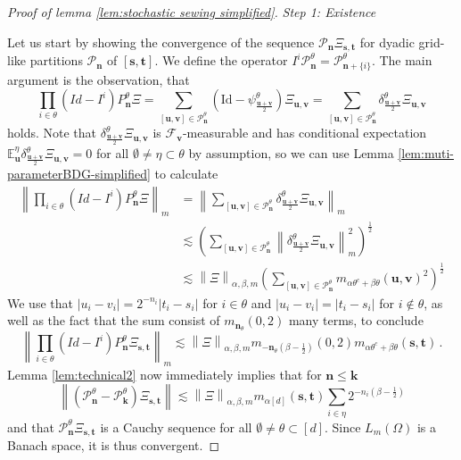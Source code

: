 \documentclass[11pt,oneside,english,reqno]{amsart}
\numberwithin{equation}{section}
\numberwithin{figure}{section}
\theoremstyle{plain}
\theoremstyle{definition}
\theoremstyle{remark}
\theoremstyle{plain}
\theoremstyle{plain}
\theoremstyle{plain}
\theoremstyle{plain}
\theoremstyle{plain}
\newcommand{\cF}{\mathcal{F}}
\newcommand{\cP}{\mathcal{P}}
\newcommand{\EE}{\mathbb{E}}
\newcommand{\bk}{\mathbf{k}}
\newcommand{\bn}{\mathbf{n}}
\newcommand{\bu}{\mathbf{u}}
\newcommand{\bv}{\mathbf{v}}
\newcommand{\bs}{\mathbf{s}}
\newcommand{\bt}{\mathbf{t}}
\newcommand{\Id}{\mathrm{Id}}
\newcommand{\norm}[1]{\left\lVert #1\right\rVert}
\newcommand{\abs}[1]{\left\lvert #1\right\rvert}
\begin{document}
\begin{proof}[Proof of lemma \ref{lem:stochastic sewing simplified}]

    \textit{Step 1: Existence}

    \noindent
    Let us start by showing the convergence of the sequence $\cP_\bn\Xi_{\bs,\bt}$ for dyadic grid-like partitions $\cP_\bn$ of $[\bs,\bt]$. We define the operator $I^i \cP^\theta_\bn = \cP^\theta_{\bn+\{i\}}$. The main argument is the observation, that
%
    \begin{equation}\label{eq:deltas}
        \prod_{i\in\theta}(Id-I^i)P^\theta_{\bn}\Xi = \sum_{[\bu,\bv]\in\cP^\theta_\bn} \left(\Id-\psi_{\frac{\bu+\bv}{2}}^\theta\right) \Xi_{\bu,\bv} = \sum_{[\bu,\bv]\in\cP^\theta_\bn} \delta^\theta_{\frac{\bu+\bv}2} \Xi_{\bu,\bv}
    \end{equation}
%
    holds. Note that $\delta^\theta_{\frac{\bu+\bv}2} \Xi_{\bu,\bv}$ is $\cF_\bv$-measurable and has conditional expectation $\EE^\eta_\bu \delta^\theta_{\frac{\bu+\bv}2} \Xi_{\bu,\bv} = 0$ for all $\emptyset\neq \eta\subset\theta$ by assumption, so we can use Lemma \ref{lem:muti-parameterBDG-simplified} to calculate
%
    \begin{align*}
        \norm{\prod_{i\in\theta}(Id-I^i)P^\theta_{\bn}\Xi}_m &= \norm{\sum_{[\bu,\bv]\in\cP^\theta_\bn} \delta^\theta_{\frac{\bu+\bv}2} \Xi_{\bu,\bv}}_m\\
        &\lesssim \left(\sum_{[\bu,\bv]\in\cP^\theta_\bn} \norm{\delta^\theta_{\frac{\bu+\bv}2} \Xi_{\bu,\bv}}_m^2\right)^{\frac12} \\
        &\lesssim \norm{\Xi}_{\alpha,\beta,m}\left(\sum_{[\bu,\bv]\in\cP^\theta_\bn} m_{\alpha\theta^c + \beta\theta}(\bu,\bv)^2\right)^{\frac 12}
    \end{align*}
%
    We use that $\abs{u_i-v_i} = 2^{-n_i}\abs{t_i-s_i}$ for $i\in\theta$ and $\abs{u_i-v_i} = \abs{t_i-s_i}$ for $i\notin\theta$, as well as the fact that the sum consist of $m_{\bn_\theta}(0,2)$ many terms, to conclude
%
    \begin{equation}\label{ineq:technicalCalc}
        \norm{\prod_{i\in\theta}(Id-I^i)P^\theta_{\bn}\Xi_{\bs,\bt}}_m\lesssim \norm{\Xi}_{\alpha,\beta,m}m_{-\bn_\theta(\beta-\frac 12)}(0,2) m_{\alpha\theta^c+\beta\theta}(\bs,\bt)\,.
    \end{equation}
%
    Lemma \ref{lem:technical2} now immediately implies that for $\bn\le\bk$
%
    \begin{equation*}
        \norm{(\cP^\theta_\bn-\cP^\theta_\bk)\Xi_{\bs,\bt}}\lesssim\norm{\Xi}_{\alpha,\beta,m}m_{\alpha[d]}(\bs,\bt)\sum_{i\in\eta}2^{-n_i(\beta-\frac 12)}
    \end{equation*}
%
    and that $\cP^\theta_\bn\Xi_{\bs,\bt}$ is a Cauchy sequence for all $\emptyset\neq\theta\subset[d]$. Since $L_m(\Omega)$ is a Banach space, it is thus convergent.


\end{proof}
\end{document}
